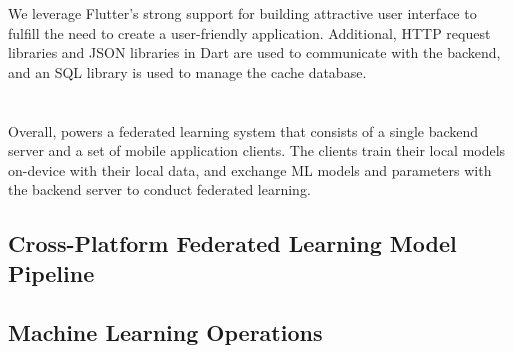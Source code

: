 We leverage Flutter's strong support for
building attractive user interface to fulfill the need to
create a user-friendly application.
Additional, HTTP request libraries and JSON libraries in Dart are used to
communicate with the backend,
and an SQL library is used to manage the cache database.

\section{\fedkit}

Overall, \fedkit powers a federated learning system that
consists of a single backend server and a set of mobile application clients.
The clients train their local models on-device with their local data,
and exchange ML models and parameters with the backend server to conduct
federated learning.

\subsection{Cross-Platform Federated Learning Model Pipeline}




\subsection{Machine Learning Operations}

